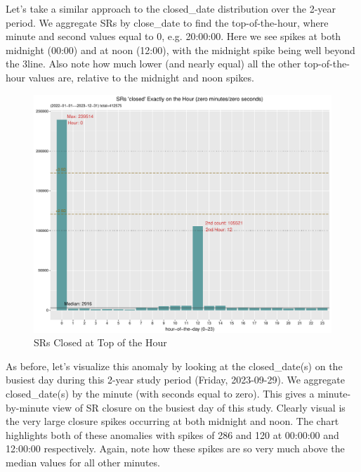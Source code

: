 \documentclass[12pt, titlepage]{article}
\begin{document}
{	Let's take a similar approach to the closed\_date distribution over the 2-year period. We aggregate 
	SRs by close\_date to find the top-of-the-hour, where minute and second values equal to 0, e.g. 20:00:00. 
	Here we see spikes at both midnight (00:00) and at noon (12:00), with the midnight spike being 
	well beyond the 3\textsigma line. Also note how much lower (and nearly equal) all the other
	top-of-the-hour values are, relative to the midnight and noon spikes. 
	
	\begin{figure}[H]
		 \centering
		 \includegraphics[width = \textwidth]{SR_closed_by_top_of_hour.pdf}
		 \caption{SRs Closed at Top of the Hour}
		 \label{fig:tophourclosed}
	\end{figure}
	
	As before, let's visualize this anomaly by looking at the closed\_date(s) on the busiest day
	during this 2-year study period (Friday, 2023-09-29). We aggregate closed\_date(s) by the
	minute (with seconds equal to zero). This gives a minute-by-minute view of SR closure
	on the busiest day of this study. Clearly visual is the very large closure spikes occurring
	at both midnight and noon. The chart highlights both of these anomalies with spikes
	of 286 and 120 at 00:00:00 and 12:00:00 respectively. Again, note how these spikes
	are so very much above the median values for all other minutes.

}
\end{document}
